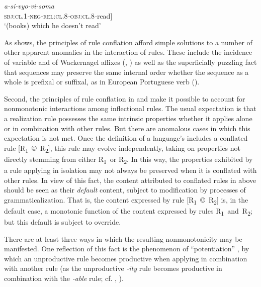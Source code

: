 \documentclass[output=paper,
modfonts
]{LSP/langsci}
\begin{document}
	 \ex  \label{ex:stump:9b}
	 \gll \textit{a\nobreakdash-si\nobreakdash-vyo\nobreakdash-vi\nobreakdash-soma}\\
	 \textsc{sbj:cl.}1\textit{\nobreakdash-}\textsc{neg}\textsc{\nobreakdash-}\textsc{rel:cl.}8\textit{\nobreakdash-}\textsc{obj:cl.}8\textit{\nobreakdash-}read]\\
	 \glt ‘(books) which he doesn’t read’

	\z
\z        



As \citet{stump-b} shows, the principles of rule conflation afford simple  solutions to a number of other apparent anomalies in the interaction of  rules. These include the incidence of variable  \citep{Bickel2007} and of Wackernagel affixes (\citealt{Nevis1992},  \citealt{Bonami2008}) as well as the superficially puzzling fact that  sequences may preserve the same internal order whether the sequence as a whole is prefixal or suffixal, as in European Portuguese verb  (\citealt{Luis2005}).

Second, the principles of rule conflation in  and  make it possible to account for nonmonotonic interactions among inflectional rules.  The usual expectation is that a realization rule possesses the same intrinsic properties whether it applies alone or in combination with other rules.  But there are anomalous cases in which this expectation is not met. Once the definition of a language’s  includes a conflated rule [R\textsubscript{1}~©~R\textsubscript{2}], this rule may evolve independently, taking on properties not directly stemming from either R\textsubscript{1}~or R\textsubscript{2}.  In this way, the properties exhibited by a rule applying in isolation may not always be preserved when it is conflated with other rules.  In view of this fact, the content attributed to conflated rules in  above should be seen as their \textit{default} content, subject to modification by processes of grammaticalization.  That is, the content expressed by rule [R\textsubscript{1}~©~R\textsubscript{2}] is, in the default case, a monotonic function of the content expressed by rules R\textsubscript{1}~and~R\textsubscript{2}; but this default is subject to override.  

There are at least three ways in which the resulting nonmonotonicity may be manifested.  One reflection of this fact is the phenomenon of ``potentiation'' \citep{Williams1981}, by which an unproductive rule becomes productive when applying in combination with another rule (as the unproductive \textit{\nobreakdash-ity} rule becomes productive in combination with the \textit{\nobreakdash-able} rule; cf. \citealt{Aronoff1976}, \citealt{Bochner1992}).  
\end{document}
